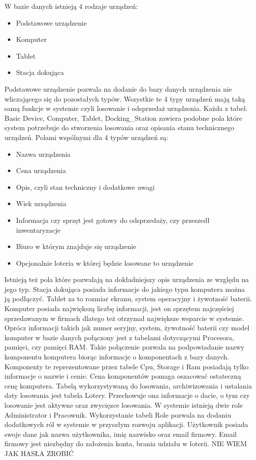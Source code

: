W bazie danych istnieją 4 rodzaje urządzeń:
\begin{itemize}
	\item Podstawowe urządzenie
	\item Komputer
	\item Tablet
	\item Stacja dokująca
\end{itemize}
Podstawowe urządzenie pozwala na dodanie do bazy danych urządzenia nie wliczającego się do pozostałych typów.
Wszystkie te 4 typy urządzeń mają taką samą funkcje w systemie czyli losowanie i odsprzedaż urządzenia. Każda z tabel: Basic Device, Computer, Tablet, Docking\_Station zawiera podobne pola które system potrzebuje do stworzenia losowania oraz opisania stanu technicznego urządzeń. Polami wspólnymi dla 4 typów urządzeń są:
\begin{itemize}
	\item Nazwa urządzenia
	\item Cena urządzenia
	\item Opis, czyli stan techniczny i dodatkowe uwagi
	\item Wiek urządzenia
	\item Informacja czy sprzęt jest gotowy do odsprzedaży, czy przeszedł inwentaryzacje
	\item Biuro w którym znajduje się urządzenie
	\item Opcjonalnie loteria w której będzie losowane to urządzenie
\end{itemize}

Istnieją też pola które pozwalają na dokładniejszy opis urządzenia ze względu na jego typ. Stacja dokująca posiada informacje do jakiego typu komputera można ją podłączyć. Tablet za to rozmiar ekranu, system operacyjny i żywotność baterii.
 Komputer posiada największą liczbę informacji, jest on sprzętem najczęściej sprzedawanym w firmach dlatego też otrzymał największe wsparcie w systemie. Oprócz informacji takich jak numer seryjny, system, żywotność baterii czy model komputer w bazie danych połączony jest z tabelami dotyczącymi Procesora, pamięci, czy pamięci RAM. Takie połączenie pozwala na podpowiadanie nazwy komponentu komputera biorąc informacje o komponentach z bazy danych. Komponenty te reprezentowane przez tabele Cpu, Storage i Ram posiadają tylko informacje o nazwie i cenie. Cena komponentów pomaga oszacować ostateczną cenę komputera.
Tabelą wykorzystywaną do losowania, archiwizowania i ustalania daty losowania jest tabela Lotery. Przechowuje ona informacje o dacie, o tym czy losowanie jest aktywne oraz zwycięzce losowania.
W systemie istnieją dwie role Administrator i Pracownik. Wykorzystanie tabeli Role pozwala na dodaniu dodatkowych ról w systemie w przyszłym rozwoju aplikacji. Użytkownik posiada swoje dane jak nazwa użytkownika, imię nazwisko oraz email firmowy. Email firmowy jest niezbędny do założenia konta, brania udziału w loterii. NIE WIEM JAK HASŁA ZROBIĆ